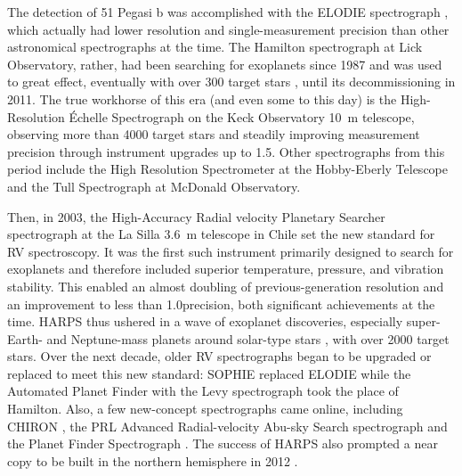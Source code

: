 The detection of 51 Pegasi b was accomplished with the ELODIE spectrograph \citep{baranne_elodie_1996}, which actually had lower resolution and single-measurement precision than other astronomical spectrographs at the time. The Hamilton spectrograph \citep{vogt_lick_1987} at Lick Observatory, rather, had been searching for exoplanets since 1987 and was used to great effect, eventually with over 300 target stars \citep{fischer_planetary_1999}, until its decommissioning in 2011. The true workhorse of this era (and even some to this day) is the High-Resolution \'Echelle Spectrograph \citep[HIRES;][]{vogt_hires_1994} on the Keck Observatory 10~m telescope, observing more than 4000 target stars and steadily improving measurement precision through instrument upgrades up to 1.5\ms. Other spectrographs from this period include the High Resolution Spectrometer \citep[HRS;][]{tull_high-resolution_1998} at the Hobby-Eberly Telescope and the Tull Spectrograph \citep{tull_high-resolution_1995} at McDonald Observatory.

Then, in 2003, the High-Accuracy Radial velocity Planetary Searcher spectrograph \citep[HARPS;][]{pepe_harps_2002, mayor_setting_2003} at the La Silla 3.6~m telescope in Chile set the new standard for RV spectroscopy. It was the first such instrument primarily designed to search for exoplanets and therefore included superior temperature, pressure, and vibration stability. This enabled an almost doubling of previous-generation resolution and an improvement to less than 1.0\ms precision, both significant achievements at the time. HARPS thus ushered in a wave of exoplanet discoveries, especially super-Earth- and Neptune-mass planets around solar-type stars \citep{pepe_harps_2011}, with over 2000 target stars. Over the next decade, older RV spectrographs began to be upgraded or replaced to meet this new standard: SOPHIE \citep{perruchot_sophie_2008} replaced ELODIE while the Automated Planet Finder with the Levy spectrograph \citep[APF+Levy;][]{vogt_apflick_2014} took the place of Hamilton. Also, a few new-concept spectrographs came online, including CHIRON \citep{tokovinin_chironfiber_2013}, the PRL Advanced Radial-velocity Abu-sky Search spectrograph \citep[PARAS;][]{chakraborty_first_2010, chakraborty_prl_2014} and the Planet Finder Spectrograph \citep[PFS;][]{crane_carnegie_2006}. The success of HARPS also prompted a near copy to be built in the northern hemisphere in 2012 \citep[HARPS-N;][]{cosentino_harps-n_2014}.

